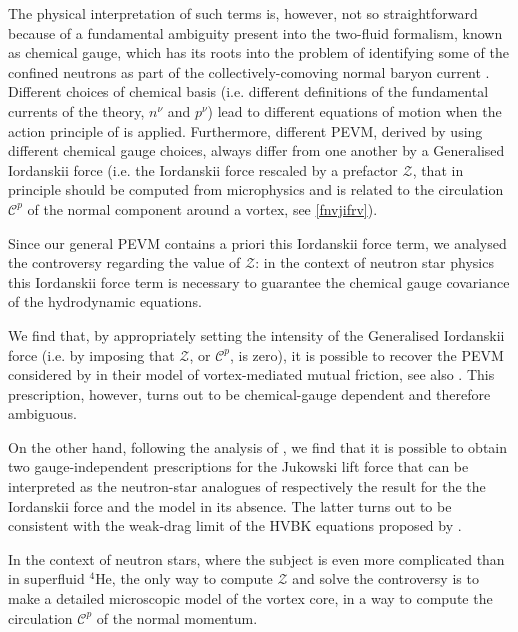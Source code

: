 \documentclass[preprints,article,accept,moreauthors,pdftex]{mdpi}
\begin{document}
The physical interpretation of such terms is, however, not so straightforward because of a fundamental ambiguity present into the two-fluid formalism, known as chemical gauge, which has its roots into the problem of identifying  some of the confined neutrons as part of the collectively-comoving normal baryon current \cite{Carter_Starting_Point,carter_macro_2006,Termo}. 
Different choices of chemical basis (i.e. different definitions of the fundamental currents of the theory, $n^\nu$ and $p^{\nu}$) lead to different equations of motion when the action principle of \citet{Carter_Starting_Point} is applied. 
Furthermore,  different PEVM, derived by using different chemical gauge choices, always differ from one another by a Generalised Iordanskii force (i.e. the Iordanskii force rescaled by a prefactor $\mathcal{Z}$, that in principle should be computed from microphysics and is related to the circulation $\mathcal{C}^p$ of the normal component around a vortex, see \eqref{fnvjifrv}). 

Since our general PEVM contains a priori this Iordanskii force term, we analysed the controversy regarding the value of  $\mathcal{Z}$: in the context of neutron star physics this Iordanskii force term is necessary to guarantee the chemical gauge covariance of the hydrodynamic equations.

We find that, by appropriately setting  the intensity of the Generalised Iordanskii force (i.e. by imposing that $\mathcal{Z}$, or $\mathcal{C}^p$, is zero), it is possible to recover the PEVM considered by  \citet{langlois98} in their model of vortex-mediated mutual friction, see also \cite{Andersson_Mutual_Friction_2016,GavassinoGeometria}. This prescription, however, turns out to be chemical-gauge dependent and therefore ambiguous.

On the other hand, following the analysis of \citet{Carter_Prix_Magnus}, we find that it is possible to obtain two gauge-independent prescriptions for the Jukowski lift force that can be interpreted as the neutron-star analogues of respectively the \citet{sonin1997PhRvB,stone2000} result for the the Iordanskii force and the \citet{Thouless2001} model in its absence. The latter turns out to be consistent with the weak-drag limit of the HVBK equations proposed by \citet{GusakovHVBK}.

In the context of neutron stars, where the subject is even more complicated than in superfluid $^4$He, the only way to compute $\mathcal{Z}$ and solve the controversy is to make a detailed microscopic model of the vortex core, in a way to compute the circulation $\mathcal{C}^p$ of the normal momentum. 
\end{document}
